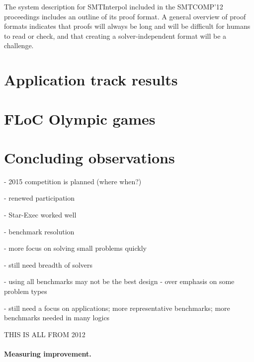 \documentclass[twosize,11pt]{article}
\begin{document}
The system description for SMTInterpol included in the SMTCOMP'12 proceedings includes an outline of its proof format. A general overview of proof formats indicates that proofs will always be long and will be difficult for humans to read or check, and that creating a solver-independent format will be a challenge.

\section{Application track results}
\label{sec:application-results}

\section{FLoC Olympic games}
\label{sec:floc}

\section{Concluding observations}
\label{sec:conclusion}

- 2015 competition is planned (where when?)

- renewed participation

- Star-Exec worked well

- benchmark resolution

- more focus on solving small problems quickly

- still need breadth of solvers

- using all benchmarks may not be the best design - over emphasis on some problem types

- still need a focus on applications; more representative benchmarks; more benchmarks needed in many logics

THIS IS ALL FROM 2012

\paragraph{Measuring improvement.}
\end{document}

